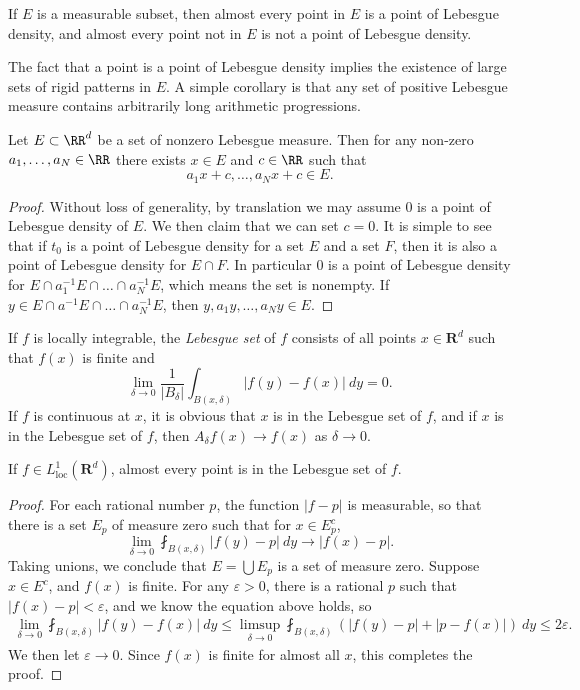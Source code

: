 \begin{theorem}
    If $E$ is a measurable subset, then almost every point in $E$ is a point of Lebesgue density, and almost every point not in $E$ is not a point of Lebesgue density.
\end{theorem}

The fact that a point is a point of Lebesgue density implies the existence of large sets of rigid patterns in $E$. A simple corollary is that any set of positive Lebesgue measure contains arbitrarily long arithmetic progressions.

\begin{theorem}
  Let $E \subset \RR^d$ be a set of nonzero Lebesgue measure. Then for any non-zero $a_1,\dots,a_N \in \RR$ there exists $x \in E$ and $c \in \RR$ such that
  \[ a_1 x + c,\dots, a_N x + c \in E. \]
\end{theorem}
\begin{proof}
  Without loss of generality, by translation we may assume $0$ is a point of Lebesgue density of $E$. We then claim that we can set $c = 0$. It is simple to see that if $t_0$ is a point of Lebesgue density for a set $E$ and a set $F$, then it is also a point of Lebesgue density for $E \cap F$. In particular $0$ is a point of Lebesgue density for $E \cap a_1^{-1} E \cap \dots \cap a_N^{-1} E$, which means the set is nonempty. If $y \in E \cap a^{-1} E \cap \dots \cap a_N^{-1} E$, then $y,a_1y, \dots, a_N y \in E$.
\end{proof}

If $f$ is locally integrable, the \emph{Lebesgue set} of $f$ consists of all points $x \in \mathbf{R}^d$ such that $f(x)$ is finite and
%
\[ \lim_{\delta \to 0} \frac{1}{|B_\delta|} \int_{B(x,\delta)} |f(y) - f(x)|\ dy = 0. \]
%
If $f$ is continuous at $x$, it is obvious that $x$ is in the Lebesgue set of $f$, and if $x$ is in the Lebesgue set of $f$, then $A_\delta f(x) \to f(x)$ as $\delta \to 0$.

\begin{theorem}
    If $f \in L^1_{\text{loc}}(\mathbf{R}^d)$, almost every point is in the Lebesgue set of $f$.
\end{theorem}
\begin{proof}
    For each rational number $p$, the function $|f - p|$ is measurable, so that there is a set $E_p$ of measure zero such that for $x \in E_p^c$,
    \[ \lim_{\delta \to 0} \fint_{B(x,\delta)} |f(y) - p|\ dy \to |f(x) - p|. \]
    Taking unions, we conclude that $E = \bigcup E_p$ is a set of measure zero. Suppose $x \in E^c$, and $f(x)$ is finite. For any $\varepsilon > 0$, there is a rational $p$ such that $|f(x) - p| < \varepsilon$, and we know the equation above holds, so
    \begin{align*}
        \lim_{\delta \to 0} \fint_{B(x,\delta)} |f(y) - f(x)|\ dy \leq \limsup_{\delta \to 0} \fint_{B(x,\delta)} \left( |f(y) - p| + |p - f(x)| \right)\ dy \leq 2\varepsilon.
    \end{align*}
    We then let $\varepsilon \to 0$. Since $f(x)$ is finite for almost all $x$, this completes the proof.
\end{proof}

